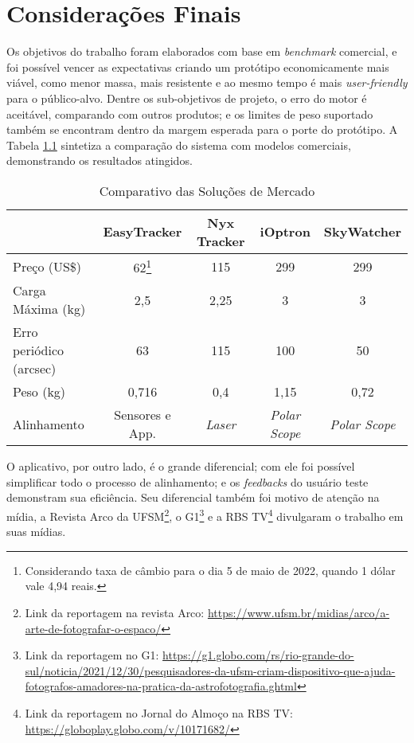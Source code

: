 \chapter{Considerações Finais}

Os objetivos do trabalho foram elaborados com base em \textit{benchmark} comercial, e foi possível vencer as expectativas criando um protótipo economicamente mais viável, como menor massa, mais resistente e ao mesmo tempo é mais \textit{user-friendly} para o público-alvo. Dentre os sub-objetivos de projeto, o erro do motor é aceitável, comparando com outros produtos; e os limites de peso suportado também se encontram dentro da margem esperada para o porte do protótipo. A Tabela \ref{tabela_benchmark_conclusao} sintetiza a comparação do sistema com modelos comerciais, demonstrando os resultados atingidos.


\begin{table}[htb]
	\caption{Comparativo das Soluções de Mercado}
	\begin{tabular}{l|cccc}
		& EasyTracker & Nyx Tracker & iOptron  & SkyWatcher \\ \hline
		Preço (US\$) & 62\footnote{Considerando taxa de câmbio para o dia 5 de maio de 2022, quando 1 dólar vale 4,94 reais. } & 115 & 299  & 299 \\\hline
		Carga Máxima (kg) & 2,5 & 2,25 & 3 & 3 \\\hline
		Erro periódico (arcsec) & 63 & 115 & 100 & 50 \\\hline
		Peso (kg) & 0,716 & 0,4 & 1,15 & 0,72 \\\hline
		Alinhamento & Sensores e App. & \textit{Laser} & \textit{Polar Scope} & \textit{Polar Scope} \\
	\end{tabular}
	\label{tabela_benchmark_conclusao}
\end{table}

O aplicativo, por outro lado, é o grande diferencial; com ele foi possível simplificar todo o processo de alinhamento; e os \textit{feedbacks} do usuário teste demonstram sua eficiência. Seu diferencial também foi motivo de atenção na mídia, a Revista Arco da UFSM\footnote{Link da reportagem na revista Arco: \url{https://www.ufsm.br/midias/arco/a-arte-de-fotografar-o-espaco/}}, o G1\footnote{Link da reportagem no G1: \url{https://g1.globo.com/rs/rio-grande-do-sul/noticia/2021/12/30/pesquisadores-da-ufsm-criam-dispositivo-que-ajuda-fotografos-amadores-na-pratica-da-astrofotografia.ghtml}} e a RBS TV\footnote{Link da reportagem no Jornal do Almoço na RBS TV: \url{https://globoplay.globo.com/v/10171682/}} divulgaram o trabalho em suas mídias.


